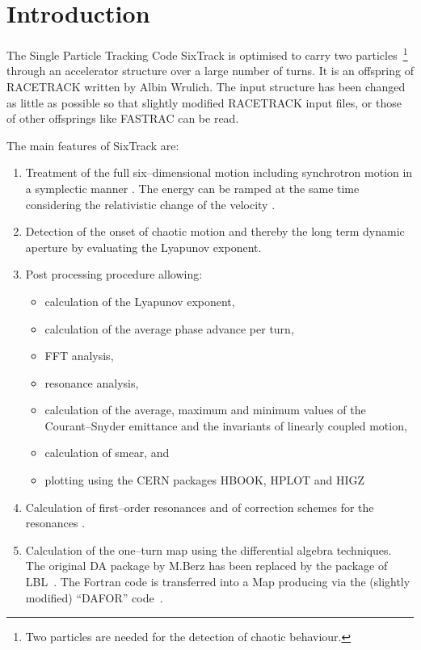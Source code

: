 \chapter{Introduction}

The Single Particle Tracking Code SixTrack is optimised to carry two particles~\footnote{%
  Two particles are needed for the detection of  chaotic behaviour.
} through an accelerator structure over a large number of turns.
It is an offspring of RACETRACK \cite{RACETRACK} written by Albin Wrulich.
The input structure has been changed as little as possible so that slightly modified RACETRACK input files, or those of other offsprings like FASTRAC \cite{FASTRAC} can be read.

The main features of SixTrack are: \bigskip
\begin{enumerate}
  \item Treatment of the full six--dimensional motion including synchrotron motion in a symplectic manner \cite{Ripken85}.
        The energy can be ramped at the same time considering the relativistic change of the velocity \cite{Ripken87}.
  \item Detection of the onset of chaotic motion and thereby the long term dynamic aperture by evaluating the Lyapunov exponent.
  \item Post processing procedure allowing:
  \begin{itemize}
    \item calculation of the Lyapunov exponent,
    \item calculation of the average phase advance per turn,
    \item FFT analysis,
    \item resonance analysis,
    \item calculation of the average, maximum and minimum values of the Courant--Snyder emittance and the invariants of linearly coupled motion,
    \item calculation of smear, and
    \item plotting using the CERN packages HBOOK, HPLOT and HIGZ \cite{HBOOK,HPLOT,HIGZ}
  \end{itemize}
  \item Calculation of first--order resonances and of correction schemes for the resonances \cite{Gilbert78}.
  \item Calculation of the one--turn map using the differential algebra techniques.
        The original DA package by M.Berz \cite{Berz89} has been replaced by the package of LBL~\cite{DALIE}.
        The Fortran code is transferred into a Map producing via the (slightly modified) ``DAFOR'' code~\cite{DAFOR}.

\end{enumerate}
